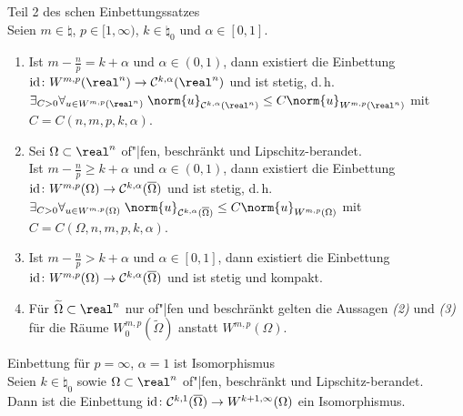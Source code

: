 \begin{Satz}{Teil 2 des schen Einbettungssatzes}\\
    Seien $m \in \natural$, $p \in [1, \infty)$, $k \in \natural_0$ und $\alpha \in [0, 1]$.
    \begin{enumerate}
        \item
        Ist $m - \frac{n}{p} = k + \alpha$ und $\alpha \in (0, 1)$, dann existiert die
        Einbettung
        $\id\colon W^{m,p}(\real^n) \to \C^{k,\alpha}(\real^n)$ und ist stetig, d.\,h.
        $\exists_{C > 0} \forall_{u \in W^{m,p}(\real^n)}\;
        \norm{u}_{\C^{k,\alpha}(\real^n)} \le C \norm{u}_{W^{m,p}(\real^n)}$ mit
        $C = C(n, m, p, k, \alpha)$.

        \item
        Sei $\Omega \subset \real^n$ of"|fen, beschränkt und Lipschitz-berandet.\\
        Ist $m - \frac{n}{p} \ge k + \alpha$ und $\alpha \in (0, 1)$, dann existiert die
        Einbettung
        $\text{id}\colon W^{m,p}(\Omega) \to \mathcal{C}^{k,\alpha}(\overline{\Omega})$
        und ist stetig, d.\,h.
        $\exists_{C > 0} \forall_{u \in W^{m,p}(\Omega)}\;
        \norm{u}_{\C^{k,\alpha}(\overline{\Omega})} \le C \norm{u}_{W^{m,p}(\Omega)}$ mit
        $C = C(\Omega, n, m, p, k, \alpha)$.

        \item
        Ist $m - \frac{n}{p} > k + \alpha$ und $\alpha \in [0, 1]$, dann existiert die Einbettung
        $\text{id}\colon W^{m,p}(\Omega) \to \mathcal{C}^{k,\alpha}(\overline{\Omega})$ und ist stetig und
        kompakt.

        \item
        Für $\widetilde{\Omega} \subset \real^n$ nur of"|fen und beschränkt gelten die Aussagen
        \emph{(2)} und \emph{(3)} für die Räume $W^{m,p}_0(\widetilde{\Omega})$ anstatt
        $W^{m,p}(\Omega)$.
    \end{enumerate}
\end{Satz}

\begin{Satz}{Einbettung für $p = \infty$, $\alpha = 1$ ist Isomorphismus}\\
    Seien $k \in \natural_0$ sowie
    $\Omega \subset \real^n$ of"|fen, beschränkt und Lipschitz-berandet.\\
    Dann ist die Einbettung
    $\text{id}\colon \mathcal{C}^{k,1}(\overline{\Omega}) \to W^{k+1,\infty}(\Omega)$ ein Isomorphismus.
\end{Satz}

\pagebreak
